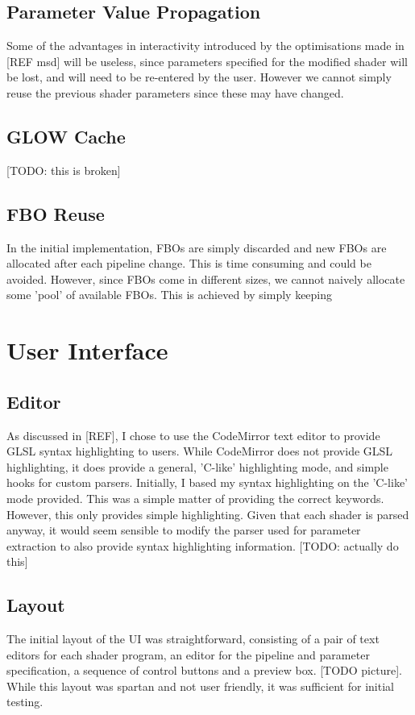 \documentclass[12pt,twoside,notitlepage]{report}
\begin{document}
\subsection{Parameter Value Propagation}
Some of the advantages in interactivity introduced by the optimisations made in [REF msd] will be useless, since parameters specified for the modified shader will be lost, and will need to be re-entered by the user. However we cannot simply reuse the previous shader parameters since these may have changed.

\subsection{GLOW Cache}
[TODO: this is broken]

\subsection{FBO Reuse}
In the initial implementation, FBOs are simply discarded and new FBOs are allocated after each pipeline change. This is time consuming and could be avoided. However, since FBOs come in different sizes, we cannot naively allocate some 'pool' of available FBOs. This is achieved by simply keeping

\section{User Interface}
\subsection{Editor}
As discussed in [REF], I chose to use the CodeMirror text editor to provide GLSL syntax highlighting to users. While CodeMirror does not provide GLSL highlighting, it does provide a general, 'C-like' highlighting mode, and simple hooks for custom parsers. Initially, I based my syntax highlighting on the 'C-like' mode provided. This was a simple matter of providing the correct keywords. However, this only provides simple highlighting. Given that each shader is parsed anyway, it would seem sensible to modify the parser used for parameter extraction to also provide syntax highlighting information. [TODO: actually do this]

\subsection{Layout}
The initial layout of the UI was straightforward, consisting of a pair of text editors for each shader program, an editor for the pipeline and parameter specification, a sequence of control buttons and a preview box. [TODO picture]. While this layout was spartan and not user friendly, it was sufficient for initial testing.
\end{document}
